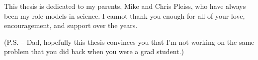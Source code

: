 This thesis is dedicated to my parents, Mike and Chris Pleiss, who have always been my role models in science.
I cannot thank you enough for all of your love, encouragement, and support over the years.

\vspace{2em}
{\small
  (P.S. -- Dad, hopefully this thesis convinces you that I'm not working on the same problem that you did back when you were a grad student.)
}
